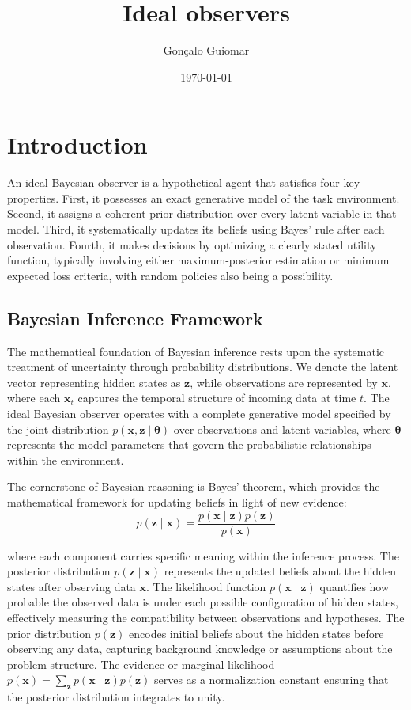 \documentclass{article}
\title{Ideal observers}
\author{Gonçalo Guiomar}
\date{\today}
\begin{document}
\maketitle

\section{Introduction}

An ideal Bayesian observer is a hypothetical agent that satisfies four key properties. First, it possesses an exact generative model of the task environment. Second, it assigns a coherent prior distribution over every latent variable in that model. Third, it systematically updates its beliefs using Bayes' rule after each observation. Fourth, it makes decisions by optimizing a clearly stated utility function, typically involving either maximum-posterior estimation or minimum expected loss criteria, with random policies also being a possibility.

\subsection{Bayesian Inference Framework}

The mathematical foundation of Bayesian inference rests upon the systematic treatment of uncertainty through probability distributions. We denote the latent vector representing hidden states as $\mathbf{z}$, while observations are represented by $\mathbf{x}$, where each $\mathbf{x}_t$ captures the temporal structure of incoming data at time $t$. The ideal Bayesian observer operates with a complete generative model specified by the joint distribution $p(\mathbf{x}, \mathbf{z} \mid \boldsymbol{\theta})$ over observations and latent variables, where $\boldsymbol{\theta}$ represents the model parameters that govern the probabilistic relationships within the environment.

The cornerstone of Bayesian reasoning is Bayes' theorem, which provides the mathematical framework for updating beliefs in light of new evidence:
\begin{equation}
p(\mathbf{z} \mid \mathbf{x}) = \frac{p(\mathbf{x} \mid \mathbf{z}) p(\mathbf{z})}{p(\mathbf{x})}
\end{equation}

where each component carries specific meaning within the inference process. The posterior distribution $p(\mathbf{z} \mid \mathbf{x})$ represents the updated beliefs about the hidden states after observing data $\mathbf{x}$. The likelihood function $p(\mathbf{x} \mid \mathbf{z})$ quantifies how probable the observed data is under each possible configuration of hidden states, effectively measuring the compatibility between observations and hypotheses. The prior distribution $p(\mathbf{z})$ encodes initial beliefs about the hidden states before observing any data, capturing background knowledge or assumptions about the problem structure. The evidence or marginal likelihood $p(\mathbf{x}) = \sum_{\mathbf{z}} p(\mathbf{x} \mid \mathbf{z}) p(\mathbf{z})$ serves as a normalization constant ensuring that the posterior distribution integrates to unity.
\end{document}
